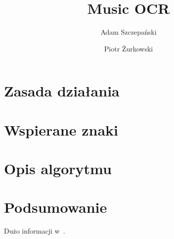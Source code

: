 \documentclass[a4paper,11pt]{article}
\title{Music OCR}
\author{
	Adam Szczepański
	\and
	Piotr Żurkowski
}
\begin{document}
\maketitle

\section{Zasada działania}

\section{Wspierane znaki}

\section{Opis algorytmu}

\section{Podsumowanie}

Dużo informacji w~\cite{10strategies}.



\end{document}
